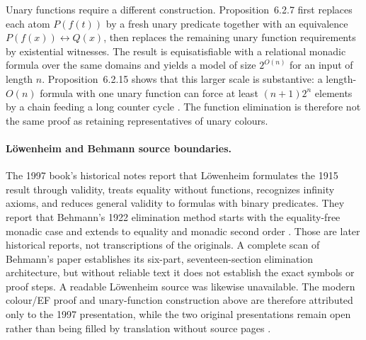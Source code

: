 Unary functions require a different construction.  Proposition~6.2.7 first
replaces each atom \(P(f(t))\) by a fresh unary predicate together with an
equivalence \(P(f(x))\leftrightarrow Q(x)\), then replaces the remaining unary
function requirements by existential witnesses.  The result is equisatisfiable
with a relational monadic formula over the same domains and yields a model of
size \(2^{O(n)}\) for an input of length \(n\).  Proposition~6.2.15 shows that
this larger scale is substantive: a length-\(O(n)\) formula with one unary
function can force at least \((n+1)2^n\) elements by a chain feeding a long
counter cycle \cite[pp.~251--257]{BorgerGradelGurevich1997}.  The function
elimination is therefore not the same proof as retaining representatives of
unary colours.

\paragraph{L\"owenheim and Behmann source boundaries.}
The 1997 book's historical notes report that L\"owenheim formulates the 1915
result through validity, treats equality without functions, recognizes
infinity axioms, and reduces general validity to formulas with binary
predicates.  They report that Behmann's 1922 elimination method starts with the
equality-free monadic case and extends to equality and monadic second order
\cite[pp.~310--311]{BorgerGradelGurevich1997}.  Those are later historical
reports, not transcriptions of the originals.  A complete scan of Behmann's
paper establishes its six-part, seventeen-section elimination architecture,
but without reliable text it does not establish the exact symbols or proof
steps.  A readable L\"owenheim source was likewise unavailable.  The modern
colour/EF proof and unary-function construction above are therefore attributed
only to the 1997 presentation, while the two original presentations remain
open rather than being filled by translation without source pages
\cite{Lowenheim1915,Behmann1922}.
